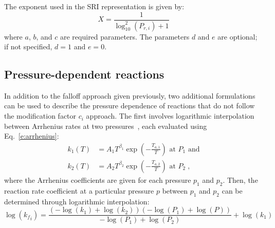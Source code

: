 \documentclass[12pt]{article}
\begin{document}
The exponent used in the SRI representation is given by:
\begin{equation}
 X = \frac{1}{\log_{10}^{2}{\left (P_{r, i} \right )} + 1}
\end{equation}
where $a$, $b$, and $c$ are required parameters.
The parameters $d$ and $e$ are optional; if not specified, $d = 1$ and $e = 0$.

\subsection{Pressure-dependent reactions}

In addition to the falloff approach given previously, two additional formulations can be used to describe the pressure dependence of reactions that do not follow the modification factor $c_i$ approach.
The first involves logarithmic interpolation between Arrhenius rates at two pressures~\cite{chemkin:2012,Goodwin:2015aa}, each evaluated using Eq.~\eqref{e:arrhenius}:
\begin{align}
k_1 (T) &= A_1 T^{\beta_1} \exp \left( -\frac{T_{a, 1}}{T} \right) \text{ at } P_1 \text{ and} \label{e:plog_k1} \\
k_2 (T) &= A_2 T^{\beta_2} \exp \left( -\frac{T_{a, 2}}{T} \right) \text{ at } P_2 \;, \label{e:plog_k2}
\end{align}
where the Arrhenius coefficients are given for each pressure $p_1$ and $p_2$.
Then, the reaction rate coefficient at a particular pressure $p$ between $p_1$ and $p_2$ can be determined through logarithmic interpolation:
\begin{equation}
\log{\left ({k_f}_{i} \right )} = \frac{\left(- \log{\left (k_{1} \right )} + \log{\left (k_{2} \right )}\right) \left(- \log{\left (P_{1} \right )} + \log{\left (P \right )}\right)}{- \log{\left (P_{1} \right )} + \log{\left (P_{2} \right )}} + \log{\left (k_{1} \right )}
\end{equation}
\end{document}
